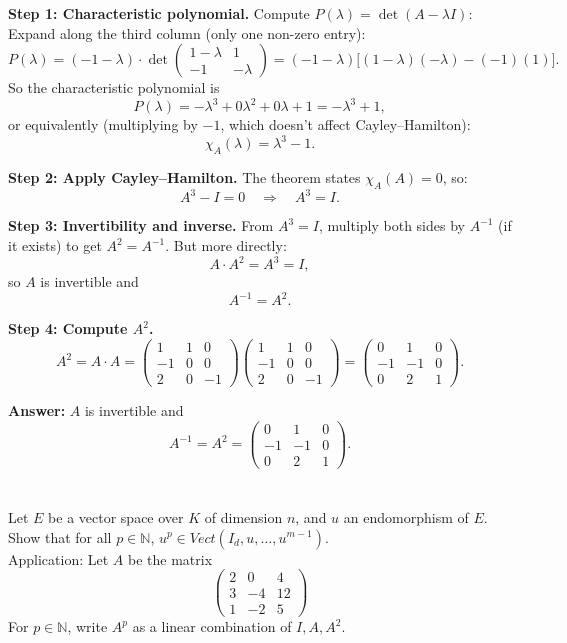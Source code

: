 \documentclass[12pt]{article}
\begin{document}
\begin{correctionbox}
\textbf{Step 1: Characteristic polynomial.}  
Compute $ P(\lambda) = \det(A - \lambda I) $:
Expand along the third column (only one non-zero entry):
\[
P(\lambda) = (-1-\lambda) \cdot \det\begin{pmatrix} 1-\lambda & 1 \\ -1 & -\lambda \end{pmatrix}
= (-1-\lambda)\big[(1-\lambda)(-\lambda) - (-1)(1)\big].
\]
So the characteristic polynomial is  
\[
P(\lambda) = -\lambda^3 + 0\lambda^2 + 0\lambda + 1 = -\lambda^3 + 1,
\]
or equivalently (multiplying by $-1$, which doesn't affect Cayley–Hamilton):
\[
\chi_A(\lambda) = \lambda^3 - 1.
\]

\textbf{Step 2: Apply Cayley–Hamilton.}  
The theorem states $ \chi_A(A) = 0 $, so:
\[
A^3 - I = 0 \quad \Longrightarrow \quad A^3 = I.
\]

\textbf{Step 3: Invertibility and inverse.}  
From $ A^3 = I $, multiply both sides by $ A^{-1} $ (if it exists) to get $ A^2 = A^{-1} $. But more directly:  
\[
A \cdot A^2 = A^3 = I,
\]
so $ A $ is invertible and 
\[
A^{-1} = A^2.
\]

\textbf{Step 4: Compute $ A^2 $.}
\[
A^2 = A \cdot A = 
\begin{pmatrix}
1 & 1 & 0 \\
-1 & 0 & 0 \\
2 & 0 & -1
\end{pmatrix}
\begin{pmatrix}
1 & 1 & 0 \\
-1 & 0 & 0 \\
2 & 0 & -1
\end{pmatrix}
=
\begin{pmatrix}
0 & 1 & 0 \\
-1 & -1 & 0 \\
0 & 2 & 1
\end{pmatrix}.
\]

\textbf{Answer:} $ A $ is invertible and 
\[
A^{-1} = A^2 = \begin{pmatrix}
0 & 1 & 0 \\
-1 & -1 & 0 \\
0 & 2 & 1
\end{pmatrix}.
\]
\end{correctionbox}

\section{}
Let \( E \) be a vector space over \( K \) of dimension \( n \), and \( u \) an endomorphism of \( E \).\\
Show that for all \( p \in \mathbb{N} \), \( u^p \in Vect(I_d, u, \ldots, u^{m-1}) \).\\
Application: Let \( A \) be the matrix
\[
\begin{pmatrix}
2 & 0 & 4 \\
3 & -4 & 12 \\
1 & -2 & 5
\end{pmatrix}
\]
For \( p \in \mathbb{N} \), write \( A^p \) as a linear combination of \( I, A, A^2 \).
\end{document}
